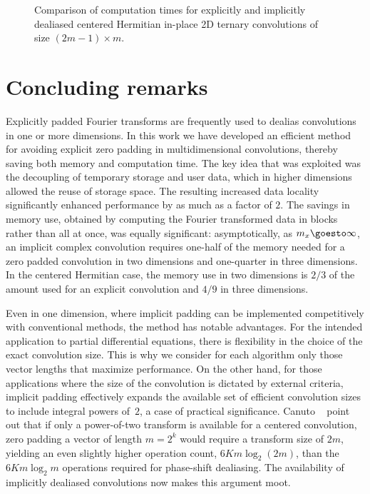 \documentclass[final]{siamltex}
\begin{document}
\begin{figure}[htbp]
\begin{minipage}{0.49\linewidth}
\begin{center}
\caption{Comparison of computation times for explicitly and implicitly
dealiased centered Hermitian in-place 2D ternary convolutions of size $(2m-1)\times m$.}
\label{timing2b}
\end{center}
\end{minipage}
\end{figure}

\section{Concluding remarks}
Explicitly padded Fourier transforms are frequently used to dealias
convolutions in one or more dimensions.
In this work we have developed an efficient method for avoiding explicit zero
padding in multidimensional convolutions, thereby saving both memory and
computation time. The key idea that was exploited was the decoupling
of temporary storage and user data, which in higher dimensions allowed
the reuse of storage space. The resulting increased data locality
significantly enhanced performance by as much as a factor of $2$.
The savings in memory use, obtained by computing the Fourier transformed
data in blocks rather than all at once, was equally significant:
asymptotically, as $m_x\goesto\infty$, an implicit complex convolution
requires one-half of the memory needed for a zero padded convolution in two
dimensions and one-quarter in three dimensions. In the centered Hermitian
case, the memory use in two dimensions is $2/3$ of the amount used for an
explicit convolution and $4/9$ in three dimensions. 

Even in one dimension, where implicit padding can be implemented
competitively with conventional methods, the method has notable advantages.
For the intended application to partial differential
equations, there is flexibility in the choice of the exact convolution
size. This is why we consider for each algorithm only those vector lengths
that maximize performance.
On the other hand, for those applications where the size of the convolution
is dictated by external criteria, implicit padding effectively expands the
available set of efficient convolution sizes to include integral powers
of~$2$, a case of practical significance.
Canuto \etal~\cite[p.136]{Canuto06} point out that if only a
power-of-two transform is available for a centered convolution, zero
padding a vector of length $m=2^k$  would require a transform size of $2m$,
yielding an even slightly higher operation count, $6Km\log_2(2m)$, than the $6K
m\log_2m$ operations required for phase-shift dealiasing. The availability
of implicitly dealiased convolutions now makes this argument moot.
\end{document}
